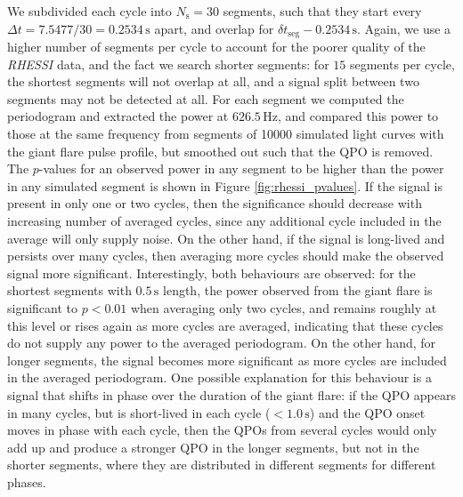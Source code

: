 \documentclass{emulateapj}
\begin{document}
We subdivided each cycle into $N_\mathrm{s} = 30$ segments, such that they start every $\Delta t = 7.5477/30 = 0.2534 \, \mathrm{s}$ apart, and overlap for $\delta t_\mathrm{seg} - 0.2534 \, \mathrm{s}$. Again, we use a higher number of segments per cycle to account for the poorer quality of the {\it RHESSI} data, and the fact we search shorter segments: for $15$ segments per cycle, the shortest segments will not overlap at all, and a signal split between two segments may not be detected at all.
For each segment we computed the periodogram and extracted the power at $626.5 \, \mathrm{Hz}$, and compared this power to those at the same frequency from segments of 10000 simulated light curves with the giant flare pulse profile, but smoothed out such that the QPO is removed. The $p$-values for an observed power in any segment to be higher than the power in any simulated segment is shown in Figure \ref{fig:rhessi_pvalues}. If the signal is present in only one or two cycles, then the significance should decrease with increasing number of averaged cycles, since any additional cycle included in the average will only supply noise. On the other hand, if the signal is long-lived and persists over many cycles, then averaging more cycles should make the observed signal more significant. Interestingly, both behaviours are observed: for the shortest segments with $0.5\, \mathrm{s}$ length, the power observed from the giant flare is significant to $p < 0.01$ when averaging only two cycles, and remains roughly at this level or rises again as more cycles are averaged, indicating that these cycles do not supply any power to the averaged periodogram. On the other hand, for longer segments, the signal becomes more significant as more cycles are included in the averaged periodogram. One possible explanation for this behaviour is a signal that shifts in phase over the duration of the giant flare: if the QPO appears in many cycles, but is short-lived in each cycle ($<1.0 \, \mathrm{s}$) and the QPO onset moves in phase with each cycle, then the QPOs from several cycles would only add up and produce a stronger QPO in the longer segments, but not in the shorter segments, where they are distributed in different segments for different phases. 
\end{document}
